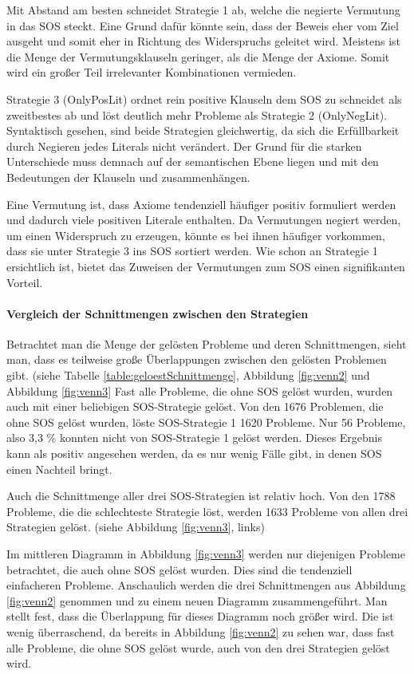 	 	Mit Abstand am besten schneidet Strategie 1 ab, welche die negierte Vermutung in das SOS steckt. Eine Grund dafür könnte sein, dass der Beweis eher vom Ziel ausgeht und somit eher in Richtung des Widerspruchs geleitet wird. Meistens ist die Menge der Vermutungsklauseln geringer, als die Menge der Axiome. Somit wird ein großer Teil irrelevanter Kombinationen vermieden.
		
		Strategie 3 (OnlyPosLit) ordnet rein positive Klauseln dem SOS zu schneidet als zweitbestes ab und löst deutlich mehr Probleme als Strategie 2 (OnlyNegLit). Syntaktisch gesehen, sind beide Strategien gleichwertig, da sich die Erfüllbarkeit durch Negieren jedes Literals nicht verändert. Der Grund für die starken Unterschiede muss demnach auf der semantischen Ebene liegen und mit den Bedeutungen der Klauseln und zusammenhängen. 
		
		Eine Vermutung ist, dass Axiome tendenziell häufiger positiv formuliert werden und dadurch viele positiven Literale enthalten. Da Vermutungen negiert werden, um einen Widerspruch zu erzeugen, könnte es bei ihnen häufiger vorkommen, dass sie unter Strategie 3 ins SOS sortiert werden. Wie schon an Strategie 1 ersichtlich ist, bietet das Zuweisen der Vermutungen zum SOS einen signifikanten Vorteil.
	
		\paragraph{Vergleich der Schnittmengen zwischen den Strategien}
	
		Betrachtet man die Menge der gelösten Probleme und deren Schnittmengen, sieht man, dass es teilweise große Überlappungen zwischen den gelösten Problemen gibt. (siehe Tabelle \ref{table:geloestSchnittmenge}, Abbildung \ref{fig:venn2} und Abbildung \ref{fig:venn3} Fast alle Probleme, die ohne SOS gelöst wurden, wurden auch mit einer beliebigen SOS-Strategie gelöst. 
		Von den 1676 Problemen, die ohne SOS gelöst wurden, löste SOS-Strategie 1 1620 Probleme. Nur 56 Probleme, also 3,3 \% konnten nicht von SOS-Strategie 1 gelöst werden. Dieses Ergebnis kann als positiv angesehen werden, da es nur wenig Fälle gibt, in denen SOS einen Nachteil bringt.
	
		Auch die Schnittmenge aller drei SOS-Strategien ist relativ hoch. Von den 1788 Probleme, die die schlechteste Strategie löst, werden 1633 Probleme von allen drei Strategien gelöst. (siehe Abbildung \ref{fig:venn3}, links) 
		
		Im mittleren Diagramm in Abbildung \ref{fig:venn3} werden nur diejenigen Probleme betrachtet, die auch ohne SOS gelöst wurden. Dies sind die tendenziell einfacheren Probleme. Anschaulich werden die drei Schnittmengen aus Abbildung \ref{fig:venn2} genommen und zu einem neuen Diagramm zusammengeführt. Man stellt fest, dass die Überlappung für dieses Diagramm noch größer wird. Die ist wenig überraschend, da bereits in Abbildung \ref{fig:venn2} zu sehen war, dass fast alle Probleme, die ohne SOS gelöst wurde, auch von den drei Strategien gelöst wird.
		
